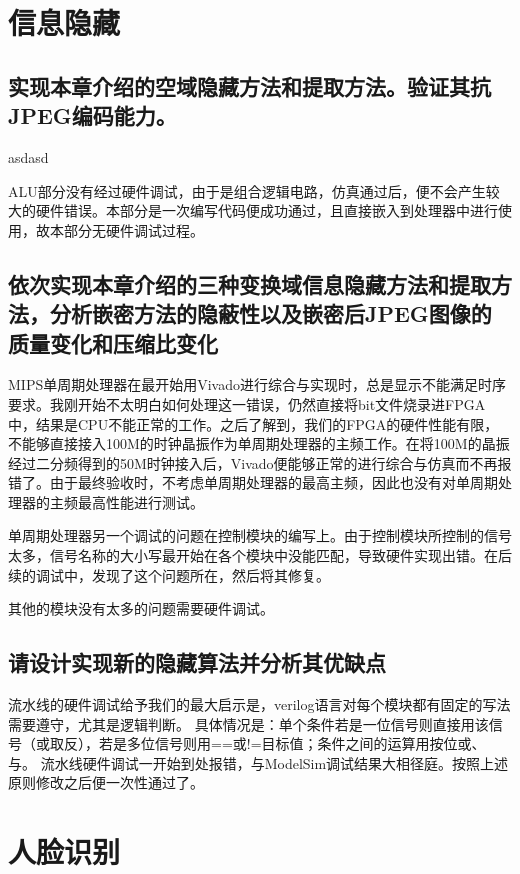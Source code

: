 \documentclass[a4paper]{article}
\begin{document}
	\section{信息隐藏}
	
	\subsection{实现本章介绍的空域隐藏方法和提取方法。验证其抗JPEG编码能力。}
	
	asdasd
	
	ALU部分没有经过硬件调试，由于是组合逻辑电路，仿真通过后，便不会产生较大的硬件错误。本部分是一次编写代码便成功通过，且直接嵌入到处理器中进行使用，故本部分无硬件调试过程。
	
	\subsection{依次实现本章介绍的三种变换域信息隐藏方法和提取方法，分析嵌密方法的隐蔽性以及嵌密后JPEG图像的质量变化和压缩比变化}
	
	MIPS单周期处理器在最开始用Vivado进行综合与实现时，总是显示不能满足时序要求。我刚开始不太明白如何处理这一错误，仍然直接将bit文件烧录进FPGA中，结果是CPU不能正常的工作。之后了解到，我们的FPGA的硬件性能有限，不能够直接接入100M的时钟晶振作为单周期处理器的主频工作。在将100M的晶振经过二分频得到的50M时钟接入后，Vivado便能够正常的进行综合与仿真而不再报错了。由于最终验收时，不考虑单周期处理器的最高主频，因此也没有对单周期处理器的主频最高性能进行测试。
	
	单周期处理器另一个调试的问题在控制模块的编写上。由于控制模块所控制的信号太多，信号名称的大小写最开始在各个模块中没能匹配，导致硬件实现出错。在后续的调试中，发现了这个问题所在，然后将其修复。
	
	其他的模块没有太多的问题需要硬件调试。
	
	\subsection{请设计实现新的隐藏算法并分析其优缺点}
	
	流水线的硬件调试给予我们的最大启示是，verilog语言对每个模块都有固定的写法需要遵守，尤其是逻辑判断。
	具体情况是：单个条件若是一位信号则直接用该信号（或取反），若是多位信号则用==或!=目标值；条件之间的运算用按位或、与。
	流水线硬件调试一开始到处报错，与ModelSim调试结果大相径庭。按照上述原则修改之后便一次性通过了。
	
	
	\section{人脸识别}
	
\end{document}
